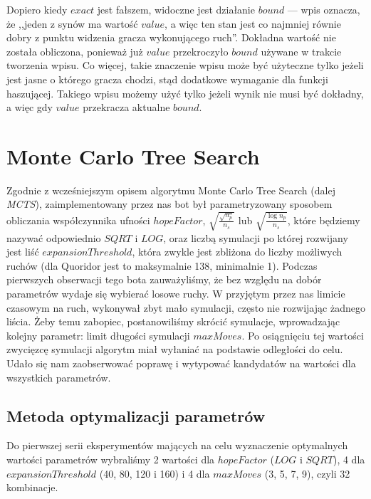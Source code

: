 \documentclass{pracamgr}
\begin{document}
Dopiero kiedy \(exact\) jest fałszem, widoczne jest działanie \(bound\) --- wpis oznacza, że ,,jeden z synów ma wartość \(value\), a więc ten stan jest co najmniej równie dobry z punktu widzenia gracza wykonującego ruch''.
Dokładna wartość nie została obliczona, ponieważ już \(value\) przekroczyło \(bound\) używane w trakcie tworzenia wpisu.
Co więcej, takie znaczenie wpisu może być użyteczne tylko jeżeli jest jasne o którego gracza chodzi, stąd dodatkowe wymaganie dla funkcji haszującej.
Takiego wpisu możemy użyć tylko jeżeli wynik nie musi być dokładny, a więc gdy \(value\) przekracza aktualne \(bound\).

\section{Monte Carlo Tree Search}

Zgodnie z wcześniejszym opisem algorytmu Monte Carlo Tree Search (dalej \emph{MCTS}), zaimplementowany przez nas bot był parametryzowany sposobem obliczania współczynnika ufności \(hopeFactor\), \(\sqrt{\frac{\sqrt{n_p}}{n_s}}\) lub \(\sqrt{\frac{\log{n_p}}{n_s}}\), które będziemy nazywać odpowiednio \(SQRT\) i \(LOG\), oraz liczbą symulacji po której rozwijany jest liść \(expansionThreshold\), która zwykle jest zbliżona do liczby możliwych ruchów (dla Quoridor jest to maksymalnie 138, minimalnie 1).
Podczas pierwszych obserwacji tego bota zauważyliśmy, że bez względu na dobór parametrów wydaje się wybierać losowe ruchy.
W przyjętym przez nas limicie czasowym na ruch, wykonywał zbyt mało symulacji, często nie rozwijając żadnego liścia.
Żeby temu zabopiec, postanowiliśmy skrócić symulacje, wprowadzając kolejny parametr: limit długości symulacji \(maxMoves\).
Po osiągnięciu tej wartości zwycięzcę symulacji algorytm miał wyłaniać na podstawie odległości do celu.
Udało się nam zaobserwować poprawę i wytypować kandydatów na wartości dla wszystkich parametrów.

\subsection{Metoda optymalizacji parametrów}

Do pierwszej serii eksperymentów mających na celu wyznaczenie optymalnych wartości parametrów wybraliśmy 2 wartości dla \(hopeFactor\) (\(LOG\) i \(SQRT\)), 4 dla \(expansionThreshold\) (40, 80, 120 i 160) i 4 dla \(maxMoves\) (3, 5, 7, 9), czyli 32 kombinacje.
\end{document}
